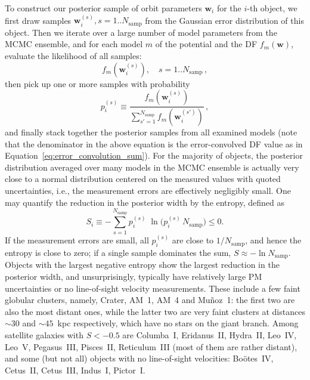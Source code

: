 \documentclass[usenatbib,fleqn]{mnras}
\begin{document}
To construct our posterior sample of orbit parameters $\boldsymbol w_i$ for the $i$-th object, we first draw samples $\boldsymbol w_i^{(s)}, s=1..N_\text{samp}$ from the Gaussian error distribution of this object. Then we iterate over a large number of model parameters from the MCMC ensemble, and for each model $m$ of the potential and the DF $f_m(\boldsymbol w)$, evaluate the likelihood of all samples:
\begin{equation}
f_m(\boldsymbol w_i^{(s)}),\quad s=1..N_\text{samp}\,,
\end{equation}
then pick up one or more samples with probability
\begin{equation}
p_i^{(s)} \equiv \frac{f_m(\boldsymbol w_i^{(s)})}{\sum_{s'=1}^{N_\text{samp}} f_m(\boldsymbol w_i^{(s')})} \,,
\end{equation}
and finally stack together the posterior samples from all examined models (note that the denominator in the above equation is the error-convolved DF value as in Equation~\ref{eq:error_convolution_sum}). For the majority of objects, the posterior distribution averaged over many models in the MCMC ensemble is actually very close to a normal distribution centered on the measured values with quoted uncertainties, i.e., the measurement errors are effectively negligibly small. One may quantify the reduction in the posterior width by the entropy, defined as 
\begin{equation}
S_i \equiv -\!\!\sum_{s=1}^{N_\text{samp}} p_i^{(s)}\; \ln\big(p_i^{(s)}\,N_\text{samp}\big) \le 0.
\end{equation}
If the measurement errors are small, all $p_i^{(s)}$ are close to $1/N_\text{samp}$, and hence the entropy is close to zero; if a single sample dominates the sum, $S\approx -\ln N_\text{samp}$. Objects with the largest negative entropy show the largest reduction in the posterior width, and unsurprisingly, typically have relatively large PM uncertainties or no line-of-sight velocity measurements. These include a few faint globular clusters, namely, Crater, AM~1, AM~4 and Mu\~noz~1: the first two are also the most distant ones, while the latter two are very faint clusters at distances $\sim30$ and $\sim45$~kpc respectively, which have no stars on the giant branch. Among satellite galaxies with $S<-0.5$ are Columba~I, Eridanus~II, Hydra~II, Leo~IV, Leo~V, Pegasus~III, Pisces~II, Reticulum~III (most of them are rather distant), and some (but not all) objects with no line-of-sight velocities: Bo\"otes~IV, Cetus~II, Cetus~III, Indus~I, Pictor~I.
\end{document}
